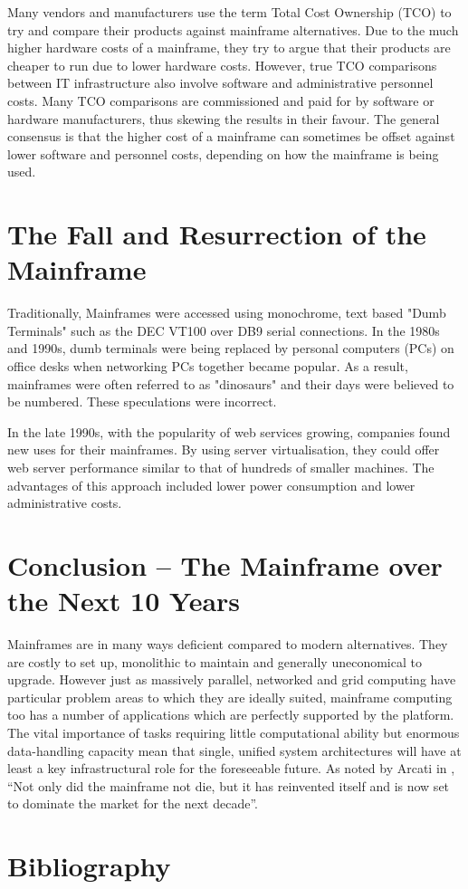 \documentclass[a4paper,12pt]{article}
\begin{document}
Many vendors and manufacturers use the term Total Cost Ownership (TCO)
to try and compare their products against mainframe alternatives. Due to
the much higher hardware costs of a mainframe, they try to argue that
their products are cheaper to run due to lower hardware costs. However,
true TCO comparisons between IT infrastructure also involve software
and administrative personnel costs. Many TCO comparisons are
commissioned and paid for by software or hardware manufacturers, thus
skewing the results in their favour. The general consensus is that the
higher cost of a mainframe can sometimes be offset against lower
software and personnel costs, depending on how the mainframe is being
used.

\section{The Fall and Resurrection of the Mainframe}

Traditionally, Mainframes were accessed using monochrome, text 
based "Dumb Terminals" such as the DEC VT100 over DB9 serial 
connections. In the 1980s and 1990s, dumb terminals were being replaced
by personal computers (PCs) on office desks when networking PCs together
became popular. As a result, mainframes were often referred to as
"dinosaurs" and their days were believed to be numbered. These
speculations were incorrect.

In the late 1990s, with the popularity of web services growing, 
companies found new uses for their mainframes. By using server
virtualisation, they could offer web server performance similar 
to that of hundreds of smaller machines. The advantages of this
approach included lower power consumption and lower administrative 
costs. \cite[The growth of e-business has also dramatically increased the 
number of backend transactions processed by tried-and-true mainframe 
software as well as the size and throughput of databases. In late 2004,
IBM's mainframe revenues were increasing even with price reductions, 
thanks to attractive TCOs.]{m1}

\section{Conclusion -- The Mainframe over the Next 10 Years}
Mainframes are in many ways deficient compared to modern alternatives. They are
costly to set up, monolithic to maintain and generally uneconomical to upgrade.
However just as massively parallel, networked and grid computing have
particular problem areas to which they are ideally suited, mainframe computing
too has a number of applications which are perfectly supported by the platform.
The vital importance of tasks requiring little computational ability but
enormous data-handling capacity mean that single, unified system architectures
will have at least a key infrastructural role for the foreseeable future. As
noted by Arcati in \cite{m9}, ``Not only did the mainframe not die, but it has
reinvented itself and is now set to dominate the market for the next decade''.


\section{Bibliography}


\end{document}
